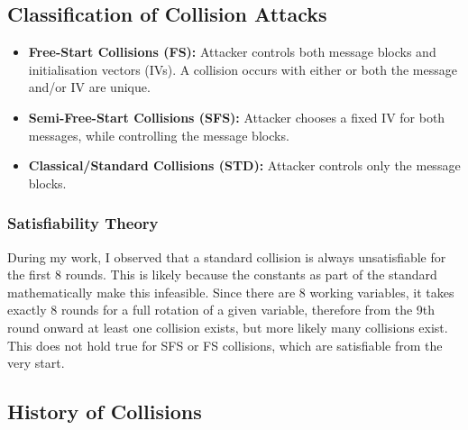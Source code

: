 \documentclass[a4paper]{report}
\begin{document}
\subsection{Classification of Collision Attacks}
\begin{itemize}
    \item \textbf{Free-Start Collisions (FS):} Attacker controls both message blocks and initialisation vectors (IVs).
			A collision occurs with either or both the message and/or IV are unique.
    \item \textbf{Semi-Free-Start Collisions (SFS):} Attacker chooses a fixed IV for both messages, while controlling the message blocks.
    \item \textbf{Classical/Standard Collisions (STD):} Attacker controls only the message blocks.
\end{itemize}

\subsubsection{Satisfiability Theory}
\label{sssec:sat-theory}
During my work, I observed that a standard collision is always unsatisfiable for the first 8 rounds.
This is likely because the constants as part of the standard mathematically make this infeasible.
Since there are 8 working variables, it takes exactly 8 rounds for a full rotation of a given variable, therefore from the 9th round onward at least one collision exists, but more likely many collisions exist.
This does not hold true for SFS or FS collisions, which are satisfiable from the very start.

\subsection{History of Collisions}
\end{document}
